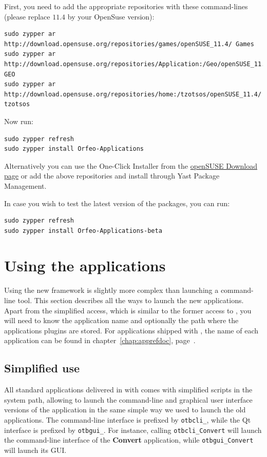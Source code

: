 First, you need to add the appropriate repositories with these
command-lines (please replace $11.4$ by your OpenSuse version):
\begin{verbatim}
sudo zypper ar 
http://download.opensuse.org/repositories/games/openSUSE_11.4/ Games
sudo zypper ar 
http://download.opensuse.org/repositories/Application:/Geo/openSUSE_11.4/ GEO
sudo zypper ar 
http://download.opensuse.org/repositories/home:/tzotsos/openSUSE_11.4/ tzotsos
\end{verbatim}

Now run:
\begin{verbatim}
sudo zypper refresh
sudo zypper install Orfeo-Applications
\end{verbatim}

Alternatively you can use the One-Click Installer from the
\href{http://software.opensuse.org/search?q=Orfeo&baseproject=openSUSE\%3A11.4&lang=en&include_home=true&exclude_debug=true}{openSUSE
  Download page} or add the above repositories and install through
Yast Package Management.

In case you wish to test the latest version of the packages, you can run:
\begin{verbatim}
sudo zypper refresh
sudo zypper install Orfeo-Applications-beta
\end{verbatim}


\section{Using the applications}\label{sec:usingapps}

Using the new \app framework is slightly more complex than launching a
command-line tool. This section describes all the ways to launch the
new applications. Apart from the simplified access, which is similar
to the former access to \app, you will need to know the application 
name and optionally the path where the applications plugins are stored.
For applications shipped with \otb, the name of each 
application can be found in chapter~\ref{chap:apprefdoc}, 
page~\pageref{chap:apprefdoc}.

\subsection{Simplified use}

All standard applications delivered in with \otb comes with simplified
scripts in the system path, allowing to launch the command-line and
 graphical user interface versions of the application in the same simple way
 we used to launch the old applications. The command-line interface is prefixed by
\verb?otbcli_?, while the Qt interface is prefixed by
\verb?otbgui_?. For instance, calling \verb?otbcli_Convert? will
launch the command-line interface of the \textbf{Convert} application,
while \verb?otbgui_Convert? will launch its GUI.

